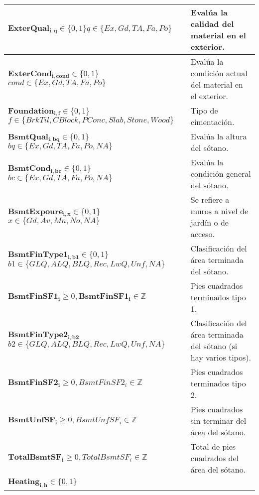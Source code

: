 \begin{longtable}{ | p{8cm} | p{5cm} | }
    \hline
    $\boldsymbol{ExterQual_{i,q}} \in \{0, 1\}$\newline $q \in \{Ex, Gd, TA, Fa, Po\}$ & Evalúa la calidad del material en el exterior.\\
    \hline
    $\boldsymbol{ExterCond_{i,cond}} \in \{0, 1\}$\newline $cond \in \{Ex, Gd, TA, Fa, Po\}$ & Evalúa la condición actual del material en el exterior.\\
    \hline 
    $\boldsymbol{Foundation_{i,f}} \in \{0, 1\}$\newline 
    $f \in \{BrkTil, CBlock, PConc, Slab, Stone, Wood\}$ & Tipo de cimentación.\\
    \hline
    $\boldsymbol{BsmtQual_{i,bq}} \in \{0, 1\}$ \newline $bq \in \{Ex, Gd, TA, Fa, Po, NA\}$ & Evalúa la altura del sótano. \\
    \hline
    $\boldsymbol{BsmtCond_{i,bc}} \in \{0, 1\}$ \newline $bc \in \{Ex, Gd, TA, Fa, Po, NA\}$ & Evalúa la condición general del sótano. \\
    \hline
    $\boldsymbol{BsmtExpoure_{i,x}} \in \{0, 1\}$ \newline $x \in \{Gd, Av, Mn, No, NA\} $ & Se refiere a muros a nivel de jardín o de acceso.\\
    \hline
    $\boldsymbol{BsmtFinType1_{i, b1}} \in \{0, 1\}$ \newline $b1 \in \{GLQ, ALQ, BLQ, Rec, LwQ, Unf, NA\}$ & Clasificación del área terminada del sótano.\\
    \hline
    $\boldsymbol{BsmtFinSF1_{i}} \geq 0, \boldsymbol{BsmtFinSF1_{i}} \in \mathbb{Z}$ & Pies cuadrados terminados tipo 1.\\
    \hline
    $\boldsymbol{BsmtFinType2_{i,b2}}$\newline $b2 \in \{GLQ, ALQ, BLQ, Rec, LwQ, Unf, NA\}$ & Clasificación del área terminada del sótano (si hay varios tipos).\\
    \hline
    $\boldsymbol{BsmtFinSF2_{i}} \geq 0, BsmtFinSF2_{i} \in \mathbb{Z}$ & Pies cuadrados terminados tipo 2.\\
    \hline
    $\boldsymbol{BsmtUnfSF_{i}} \geq 0, BsmtUnfSF_{i} \in \mathbb{Z}$ & Pies cuadrados sin terminar del área del sótano.\\
    \hline
    $\boldsymbol{TotalBsmtSF_{i}} \geq 0, TotalBsmtSF_{i} \in \mathbb{Z}$ & Total de pies cuadrados del área del sótano.\\
    \hline
    $\boldsymbol{Heating_{i,h}} \in \{0, 1\}$\newline 

\end{longtable}
